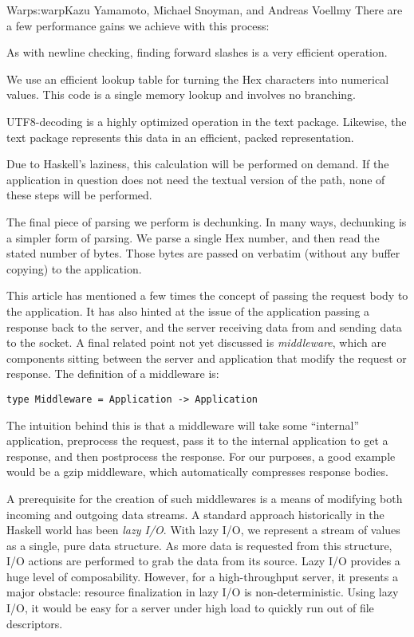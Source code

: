 \begin{aosachapter}{Warp}{s:warp}{Kazu Yamamoto, Michael Snoyman, and Andreas Voellmy}
\noindent There are a few performance gains we achieve with this
process:

\begin{aosaenumerate}
\def\labelenumi{\arabic{enumi}.}

\item
  As with newline checking, finding forward slashes is a very efficient
  operation.
\item
  We use an efficient lookup table for turning the Hex characters into
  numerical values. This code is a single memory lookup and involves no
  branching.
\item
  UTF8-decoding is a highly optimized operation in the text package.
  Likewise, the text package represents this data in an efficient,
  packed representation.
\item
  Due to Haskell's laziness, this calculation will be performed on
  demand. If the application in question does not need the textual
  version of the path, none of these steps will be performed.
\end{aosaenumerate}

The final piece of parsing we perform is dechunking. In many ways,
dechunking is a simpler form of parsing. We parse a single Hex number,
and then read the stated number of bytes. Those bytes are passed on
verbatim (without any buffer copying) to the application.


This article has mentioned a few times the concept of passing the
request body to the application. It has also hinted at the issue of the
application passing a response back to the server, and the server
receiving data from and sending data to the socket. A final related
point not yet discussed is \emph{middleware}, which are components
sitting between the server and application that modify the request or
response. The definition of a middleware is:

\begin{verbatim}
type Middleware = Application -> Application
\end{verbatim}

The intuition behind this is that a middleware will take some
``internal'' application, preprocess the request, pass it to the
internal application to get a response, and then postprocess the
response. For our purposes, a good example would be a gzip middleware,
which automatically compresses response bodies.

A prerequisite for the creation of such middlewares is a means of
modifying both incoming and outgoing data streams. A standard approach
historically in the Haskell world has been \emph{lazy I/O}. With lazy
I/O, we represent a stream of values as a single, pure data structure.
As more data is requested from this structure, I/O actions are performed
to grab the data from its source. Lazy I/O provides a huge level of
composability. However, for a high-throughput server, it presents a
major obstacle: resource finalization in lazy I/O is non-deterministic.
Using lazy I/O, it would be easy for a server under high load to quickly
run out of file descriptors.


\end{aosachapter}
